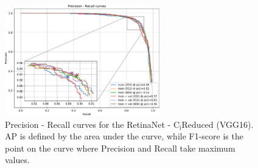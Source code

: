 \begin{savenotes}
\begin{table}[!htb]
  \centering
  \caption{Comparing performance of RetinaNet - $\text{C}_\text{i}\text{Reduced}$ (VGG16), trained on the training and on the combined training - validation set, with the state-of-the-art models. Parentheses indicate resolutions. Models were evaluated on $\text{IoU}_{th}=0.2$ and $\text{NMS}_{th}=0.3$.}
  \label{ch5:tab4}
\end{table}
\end{savenotes}

\begin{figure}[!htb]
  \centering
  \includegraphics[width=0.6\textwidth]{figures/ch5/fig4.pdf}
  \caption{Precision - Recall curves for the RetinaNet - $\text{C}_\text{i}\text{Reduced}$ (VGG16). AP is defined by the area under the curve, while F1-score is the point on the curve where Precision and Recall take maximum values.}
  \label{ch5:fig4}
\end{figure} 

